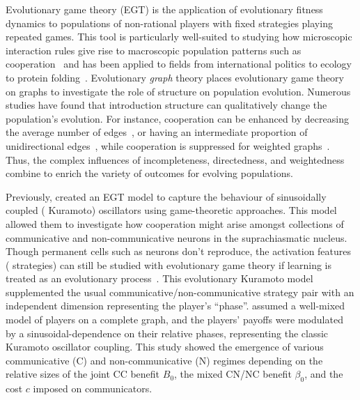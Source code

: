 \documentclass[pdflatex,lineno,referee,sn-mathphys-ay]{sn-jnl}
\begin{document}
Evolutionary game theory (EGT) is the application
of evolutionary fitness dynamics
to populations of non-rational players with fixed strategies playing repeated games.
This tool is particularly well-suited to studying how microscopic interaction rules
give rise to macroscopic population patterns
such as cooperation~\citep[\eg{}][and sources therein]{sigmund1999evolutionary}
and has been applied to fields from international politics to ecology
to protein folding~\citep[\cf{}][and references therein]{traulsen2023future}.
Evolutionary \emph{graph} theory places evolutionary game theory
on graphs to investigate the role of structure on population evolution.
Numerous studies have found that introduction structure
can qualitatively change the population's evolution.
For instance, cooperation can be enhanced by
decreasing the average number of edges~\citep{ohtsuki2006simple},
or having an intermediate proportion
of unidirectional edges~\citep{su2022evolution},
while cooperation is suppressed
for weighted graphs~\citep{bhaumik2024constant}.
Thus, the complex influences of
incompleteness, directedness, and weightedness combine
to enrich the variety of outcomes for evolving populations.

Previously, \citet{tripp2022evolutionary} created an EGT model
to capture the behaviour of sinusoidally coupled (\ie{} Kuramoto) oscillators
using game-theoretic approaches.
This model allowed them to investigate how cooperation might arise
amongst collections of communicative and non-communicative neurons
in the suprachiasmatic nucleus.
Though permanent cells such as neurons don't reproduce,
the activation features (\ie{} strategies) can still
be studied with evolutionary game theory
if learning is treated as
an evolutionary process~\citep{cohen2009evolutionary}.
This evolutionary Kuramoto model
supplemented the usual communicative/non-communicative
strategy pair with an independent dimension representing the player's ``phase''.
 assumed a well-mixed model of players
on a complete graph, and the players' payoffs were modulated
by a sinusoidal-dependence on their relative phases,
representing the classic Kuramoto oscillator coupling.
This study showed the emergence of various communicative (C)
and non-communicative (N) regimes depending on the relative sizes
of the joint CC benefit $B_0$, the mixed CN/NC benefit $\beta_0$,
and the cost $c$ imposed on communicators.
\end{document}
